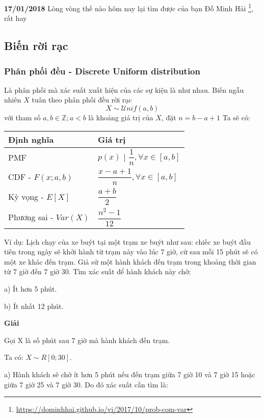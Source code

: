 \textbf{17/01/2018} Lòng vòng thế nào hôm nay lại tìm được của bạn Đỗ Minh Hải \footnote{\href{https://dominhhai.github.io/vi/2017/10/prob-com-var}{https://dominhhai.github.io/vi/2017/10/prob-com-var}}, rất hay

\subsection{Biến rời rạc}

\subsubsection{Phân phối đều - Discrete Uniform distribution}

Là phân phối mà xác suất xuất hiện của các sự kiện là như nhau.
\newline
Biến ngẫu nhiên $X$ tuân theo phân phối đều rời rạc
$$X \sim \mathcal{U}nif (a, b)$$
với tham số $a, b \in \mathbb Z; a < b$ là khoảng giá trị của $X$, đặt $n = b-a+1$
\newline
Ta sẽ có:
\newline
\begin{tabular}[c]{ | l | l | }
  \hline
  Định nghĩa & Giá trị \\
  \hline
  PMF & $p(x)$ | $\dfrac{1}{n}, \forall x \in [a,b]$ \\
  \hline
  CDF - $F(x;a,b)$ & $\dfrac{x-a+1}{n}, \forall x \in [a,b]$ \\
  \hline
  Kỳ vọng - $E[X]$ & $\dfrac{a+b}{2}$ \\
  \hline
  Phương sai - $Var(X)$ & $\dfrac{n^2-1}{12}$ \\
  \hline
\end{tabular}

\newline
Ví dụ: Lịch chạy của xe buýt tại một trạm xe buýt như sau: chiếc xe buýt đầu tiên trong ngày sẽ khởi hành từ trạm này vào lúc 7 giờ, cứ sau mỗi 15 phút sẽ có một xe khác đến trạm. Giả sử một hành khách đến trạm trong khoảng thời gian từ 7 giờ đến 7 giờ 30. Tìm xác suất để hành khách này chờ:

a) Ít hơn 5 phút.

b) Ít nhất 12 phút.

\textbf{Giải}

Gọi X là số phút sau 7 giờ mà hành khách đến trạm.

Ta có: $X \sim R[0;30]$.

a) Hành khách sẽ chờ ít hơn 5 phút nếu đến trạm giữa 7 giờ 10 và 7 giờ 15 hoặc giữa 7 giờ 25 và 7 giờ 30. Do đó xác suất cần tìm là:

